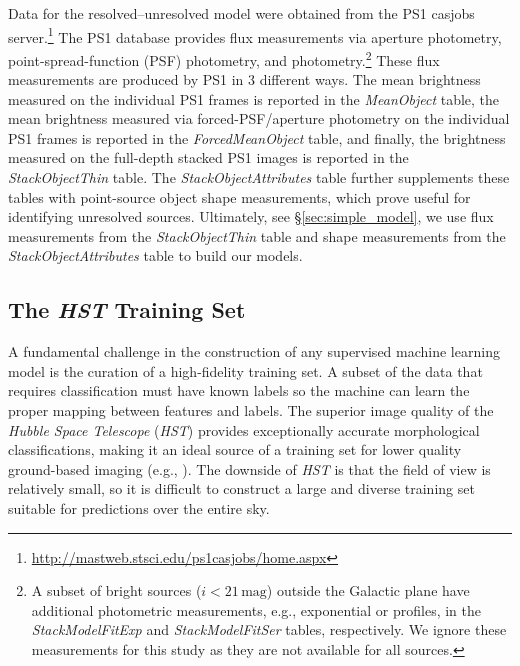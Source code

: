 \documentclass[twocolumn, dvipdfmx]{aastex62}
\begin{document}
\begin{CJK*}{UTF8}{gbsn}
Data for the resolved--unresolved model were obtained from the PS1 casjobs
server.\footnote{\url{http://mastweb.stsci.edu/ps1casjobs/home.aspx}} The
PS1 database provides flux measurements via aperture photometry,
point-spread-function (PSF) photometry, and \citet{Kron80}
photometry.\footnote{A subset of bright sources ($i < 21\,\mathrm{mag}$)
outside the Galactic plane have additional photometric measurements, e.g.,
exponential or \citet{Sersic63} profiles, in the \textit{StackModelFitExp}
and \textit{StackModelFitSer} tables, respectively. We ignore these
measurements for this study as they are not available for all sources.}
These flux measurements are produced by PS1 in 3 different ways. The mean
brightness measured on the individual PS1 frames is reported in the
\textit{MeanObject} table, the mean brightness measured via
forced-PSF/aperture photometry on the individual PS1 frames is reported in
the \textit{ForcedMeanObject} table, and finally, the brightness measured on
the full-depth stacked PS1 images is reported in the
\textit{StackObjectThin} table. The \textit{StackObjectAttributes} table
further supplements these tables with point-source object shape
measurements, which prove useful for identifying unresolved sources.
Ultimately, see \S\ref{sec:simple_model}, we use flux measurements from the
\textit{StackObjectThin} table and shape measurements from the
\textit{StackObjectAttributes} table to build our models.

\subsection{The \textit{HST} Training Set} \label{sec:hst_train}

A fundamental challenge in the construction of any supervised machine learning
model is the curation of a high-fidelity training set. A subset of the data
that requires classification must have known labels so the machine can learn
the proper mapping between features and labels. The superior image quality of
the \textit{Hubble Space Telescope} (\textit{HST}) provides exceptionally
accurate morphological classifications, making it an ideal source of a training
set for lower quality ground-based imaging (e.g., \citealt{Lupton01}). The
downside of \textit{HST} is that the field of view is relatively small, so it
is difficult to construct a large and diverse training set suitable for
predictions over the entire sky.


\end{CJK*}
\end{document}
